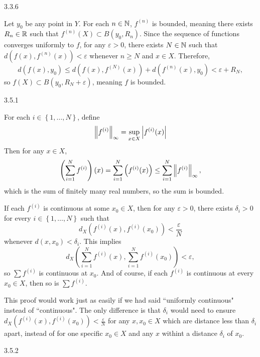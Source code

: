 \documentclass{article}
\begin{document}
\bigskip
\begin{prob}
    3.3.6
\end{prob}
Let $y_0$ be any point in $Y$. For each $n \in \mathbb{N}$, $f^{(n)}$ is bounded, meaning there exists $R_n \in \mathbb{R}$ such that $f^{(n)}(X) \subset B(y_0, R_n)$. Since the sequence of functions converges uniformly to $f$, for any $\varepsilon > 0$, there exists $N \in \mathbb{N}$ such that $d(f(x), f^{(n)}(x)) < \varepsilon$ whenever $n \geq N$ and $x \in X$. Therefore,
\[ d(f(x), y_0) \leq d(f(x), f^{(N)}(x)) + d(f^{(n)}(x), y_0) < \varepsilon + R_N, \]
so $f(X) \subset B(y_0, R_N + \varepsilon)$, meaning $f$ is bounded.

\bigskip
\begin{prob}
    3.5.1
\end{prob}
For each $i \in \left\{ 1, \dots, N \right\}$, define
\[ \left\lVert f^{(i)}\right\rVert_\infty = \sup_{x \in X} \left\lvert f^{(i)}(x) \right\rvert \]
Then for any $x \in X$,
\[ \left( \sum_{i=1}^N f^{(i)} \right) (x) = \sum_{i=1}^N \left( f^{(i)}(x) \right) \leq \sum_{i=1}^N \left\lVert f^{(i)}\right\rVert_\infty, \]
which is the sum of finitely many real numbers, so the sum is bounded.
\par
If each $f^{(i)}$ is continuous at some $x_0 \in X$, then for any $\varepsilon > 0$, there exists $\delta_i > 0$ for every $i \in \left\{ 1, \dots, N \right\}$ such that
\[ d_X(f^{(i)}(x), f^{(i)}(x_0)) < \frac{\varepsilon}{N} \]
whenever $d(x, x_0) < \delta_i$. This implies
\[ d_X \left( \sum_{i=1}^N f^{(i)}(x), \sum_{i=1}^N f^{(i)}(x_0) \right) < \varepsilon, \]
so $\sum f^{(i)}$ is continuous at $x_0$. And of course, if each $f^{(i)}$ is continuous at every $x_0 \in X$, then so is $\sum f^{(i)}$.
\par
This proof would work just as easily if we had said ``uniformly continuous" instead of ``continuous". The only difference is that $\delta_i$ would need to ensure $d_X(f^{(i)}(x), f^{(i)}(x_0)) < \frac{\varepsilon}{N}$ for any $x, x_0 \in X$ which are distance less than $\delta_i$ apart, instead of for one specific $x_0 \in X$ and any $x$ withint a distance $\delta_i$ of $x_0$.

\bigskip
\begin{prob}
    3.5.2
\end{prob}


\end{document}

